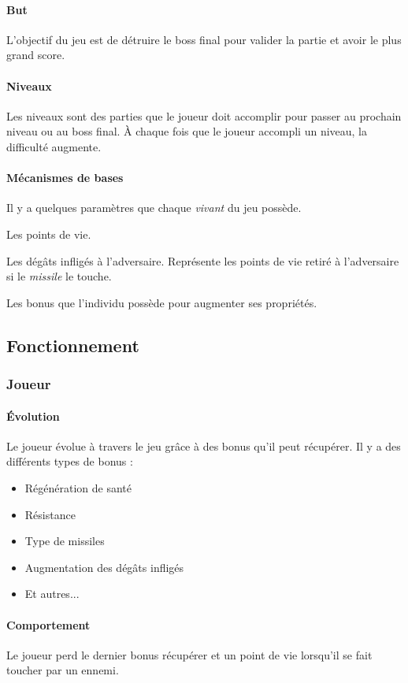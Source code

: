 \documentclass[11pt, a4paper, oneside]{article}
\begin{document}
\paragraph{But}
L'objectif du jeu est de détruire le boss final pour valider la partie et avoir le plus grand score.
\paragraph{Niveaux}
Les niveaux sont des parties que le joueur doit accomplir pour passer au prochain niveau ou au boss final. À chaque fois que le joueur accompli un niveau, la difficulté augmente.
\paragraph{Mécanismes de bases}
Il y a quelques paramètres que chaque \emph{vivant} du jeu possède.
\begin{description}
\setlength{\itemindent}{-.cm}
	\item[— Santé] Les points de vie.
	\item[— Dégâts] Les dégâts infligés à l'adversaire. Représente les points de vie retiré à l'adversaire si le \emph{missile} le touche.
	\item[— Bonus] Les bonus que l'individu possède pour augmenter ses propriétés.
\end{description}
\subsection{Fonctionnement}
\subsubsection{Joueur}
\paragraph{Évolution}
Le joueur évolue à travers le jeu grâce à des bonus qu'il peut récupérer. Il y a des différents types de bonus :
\begin{itemize}
	\item Régénération de santé
	\item Résistance
	\item Type de missiles
	\item Augmentation des dégâts infligés
	\item Et autres...
\end{itemize}
\paragraph{Comportement}
Le joueur perd le dernier bonus récupérer et un point de vie lorsqu'il se fait toucher par un ennemi.
\end{document}
